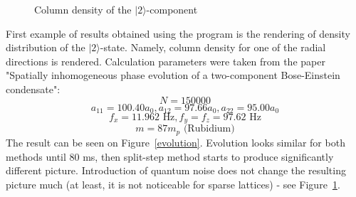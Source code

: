 \documentclass[12pt,notitlepage]{report}
\begin{document}
\begin{figure}
\begin{center}
\qquad
{}
\end{center}
\caption{Column density of the $\mid2\rangle$-component}
\label{evolution-noise}
\end{figure}

First example of results obtained using the program is the rendering of density distribution of the $\mid2\rangle$-state. Namely, column density for one of the radial directions is rendered. Calculation parameters were taken from the paper "Spatially inhomogeneous phase evolution of a two-component Bose-Einstein condensate":
\[ N = 150000 \]
\[ a_{11} = 100.40 a_0, a_{12} = 97.66 a_0, a_{22} = 95.00 a_0 \]
\[ f_x = 11.962 \textrm{ Hz}, f_y = f_z = 97.62 \textrm{ Hz} \]
\[ m = 87 m_p \textrm{ (Rubidium)}\]
The result can be seen on Figure~\ref{evolution}. Evolution looks similar for both methods until 80 ms, then split-step method starts to produce significantly different picture. Introduction of quantum noise does not change the resulting picture much (at least, it is not noticeable for sparse lattices) - see Figure~\ref{evolution-noise}.
\end{document}
